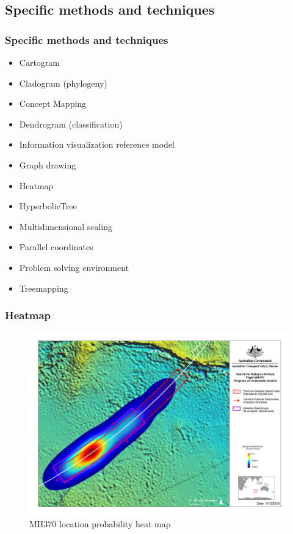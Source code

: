 \documentclass{beamer}
\begin{document}
\subsection{Specific methods and techniques}

\begin{frame}
  \frametitle{Specific methods and techniques}

  \begin{itemize}
    \item Cartogram
    \item Cladogram (phylogeny)
    \item Concept Mapping
    \item Dendrogram (classification)
    \item Information visualization reference model
    \item Graph drawing
    \item Heatmap
    \item HyperbolicTree
    \item Multidimensional scaling
    \item Parallel coordinates
    \item Problem solving environment
    \item Treemapping
  \end{itemize}
\end{frame}

\begin{frame}
  \frametitle{Heatmap}
  \begin{figure}
    \begin{center}
      \includegraphics[width=0.8\linewidth]{images//heat.jpg}
      \caption{MH370 location probability heat map}
      \label{Fig:1}
    \end{center}
  \end{figure}
\end{frame}
\end{document}
